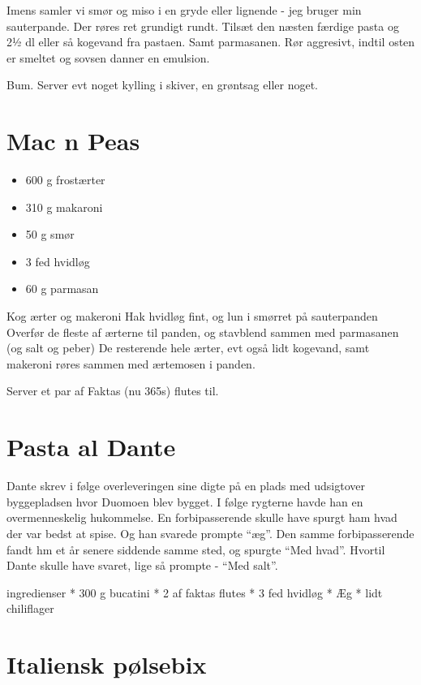 \documentclass[
]{book}
\providecommand{\tightlist}{%
  \setlength{\itemsep}{0pt}\setlength{\parskip}{0pt}}
\begin{document}
Imens samler vi smør og miso i en gryde eller lignende - jeg
bruger min sauterpande. Der røres ret grundigt rundt.
Tilsæt den næsten færdige pasta og 2½ dl eller så kogevand
fra pastaen. Samt parmasanen. Rør aggresivt, indtil
osten er smeltet og sovsen danner en emulsion.

Bum. Server evt noget kylling i skiver, en grøntsag eller noget.

\section{Mac n Peas}\label{mac-n-peas}

\begin{itemize}
\tightlist
\item
  600 g frostærter
\item
  310 g makaroni
\item
  50 g smør
\item
  3 fed hvidløg
\item
  60 g parmasan
\end{itemize}

Kog ærter og makeroni
Hak hvidløg fint, og lun i smørret på sauterpanden
Overfør de fleste af ærterne til panden, og stavblend sammen med parmasanen (og salt og peber)
De resterende hele ærter, evt også lidt kogevand, samt makeroni røres sammen med ærtemosen i panden.

Server et par af Faktas (nu 365s) flutes til.

\section{Pasta al Dante}\label{pasta-al-dante}

Dante skrev i følge overleveringen sine digte på en plads med udsigtover byggepladsen hvor Duomoen blev bygget. I følge rygterne havde han en overmenneskelig hukommelse.
En forbipasserende skulle have spurgt ham hvad der var bedst at spise. Og han svarede prompte ``æg''. Den samme forbipasserende fandt hm et år senere siddende samme sted, og spurgte ``Med hvad''. Hvortil Dante skulle have svaret, lige så prompte - ``Med salt''.

ingredienser
* 300 g bucatini
* 2 af faktas flutes
* 3 fed hvidløg
* Æg
* lidt chiliflager

\section{Italiensk pølsebix}\label{italiensk-puxf8lsebix}
\end{document}
